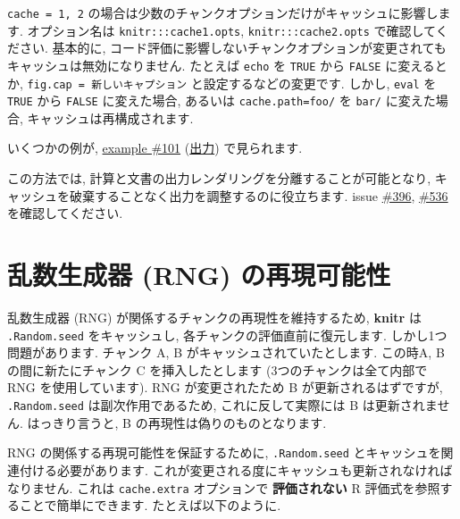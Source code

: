 \documentclass[
  xelatex,ja=standard,jafont=noto]{bxjsreport}
\begin{document}
\texttt{cache\ =\ 1,\ 2}
の場合は少数のチャンクオプションだけがキャッシュに影響します.
オプション名は \texttt{knitr:::cache1.opts},
\texttt{knitr:::cache2.opts} で確認してください. 基本的に,
コード評価に影響しないチャンクオプションが変更されてもキャッシュは無効になりません.
たとえば \texttt{echo} を \texttt{TRUE} から \texttt{FALSE}
に変えるとか,
\texttt{fig.cap\ =\ \textquotesingle{}新しいキャプション\textquotesingle{}}
と設定するなどの変更です. しかし, \texttt{eval} を \texttt{TRUE} から
\texttt{FALSE} に変えた場合, あるいは
\texttt{cache.path=\textquotesingle{}foo/\textquotesingle{}} を
\texttt{\textquotesingle{}bar/\textquotesingle{}} に変えた場合,
キャッシュは再構成されます.

いくつかの例が, \href{https://github.com/yihui/knitr-examples/}{example
\#101}
(\href{https://github.com/yihui/knitr-examples/blob/master/101-cache-levels.md}{出力})
で見られます.

この方法では, 計算と文書の出力レンダリングを分離することが可能となり,
キャッシュを破棄することなく出力を調整するのに役立ちます. issue
\href{https://github.com/yihui/knitr/issues/396}{\#396},
\href{https://github.com/yihui/knitr/issues/536}{\#536}
を確認してください.

\hypertarget{ux4e71ux6570ux751fux6210ux5668-rng-ux306eux518dux73feux53efux80fdux6027}{%
\section*{乱数生成器 (RNG)
の再現可能性}\label{ux4e71ux6570ux751fux6210ux5668-rng-ux306eux518dux73feux53efux80fdux6027}}

乱数生成器 (RNG) が関係するチャンクの再現性を維持するため,
\textbf{knitr} は \texttt{.Random.seed} をキャッシュし,
各チャンクの評価直前に復元します. しかし1つ問題があります. チャンク A, B
がキャッシュされていたとします. この時A, B の間に新たにチャンク C
を挿入したとします (3つのチャンクは全て内部で RNG を使用しています). RNG
が変更されたため B が更新されるはずですが, \texttt{.Random.seed}
は副次作用であるため, これに反して実際には B は更新されません.
はっきり言うと, B の再現性は偽りのものとなります.

RNG の関係する再現可能性を保証するために, \texttt{.Random.seed}
とキャッシュを関連付ける必要があります.
これが変更される度にキャッシュも更新されなければなりません. これは
\texttt{cache.extra} オプションで \textbf{評価されない} R
評価式を参照することで簡単にできます. たとえば以下のように.
\end{document}
